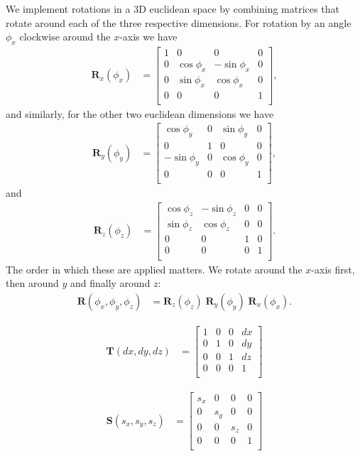 \documentclass[10pt,journal,draftclsnofoot,onecolumn]{IEEEtran}
\newcommand\bmat[1]{\begin{bmatrix}#1\end{bmatrix}}
\newcommand\mat[1]{\boldsymbol{#1}}
\newcommand\1{\vec 1}
\newcommand*\R{\mat R}
\begin{document}
We implement rotations in a 3D euclidean space by combining matrices that rotate around each of the three respective dimensions. For rotation by an angle $\phi_x$ clockwise around the $x$-axis we have
\begin{align}
\R_x(\phi_x) &= \bmat{
1  &  0           &  0           &  0 \\
0  &  \cos\phi_x  &  -\sin\phi_x &  0 \\
0  &  \sin\phi_x  &  \cos\phi_x  &  0 \\
0  &  0           &  0           &  1 \\
},
\end{align}
and similarly, for the other two euclidean dimensions we have
\begin{align}
\R_y(\phi_y) &= \bmat{
\cos\phi_y  &  0  &  \sin\phi_y  &  0 \\
0           &  1  &  0           &  0 \\
-\sin\phi_y &  0  &  \cos\phi_y  &  0 \\
0           &  0  &  0           &  1 \\
},
\end{align}
and
\begin{align}
\R_z(\phi_z) &= \bmat{
\cos\phi_z  &  -\sin\phi_z &  0  &  0 \\
\sin\phi_z  &  \cos\phi_z  &  0  &  0 \\
0           &  0           &  1  &  0 \\
0           &  0           &  0  &  1 \\
}.
\end{align}
The order in which these are applied matters. We rotate around the $x$-axis first, then around $y$ and finally around $z$:
\begin{align}
\R(\phi_x, \phi_y, \phi_z) &= \R_z(\phi_z)\;\R_y(\phi_y)\;\R_x(\phi_x).
\end{align}

\begin{align}
\boldsymbol{T}(dx,dy,dz) &= \bmat{
1  &  0  &  0  &  dx \\
0  &  1  &  0  &  dy \\
0  &  0  &  1  &  dz \\
0  &  0  &  0  &  1 \\
}
\end{align}

\begin{align}
\boldsymbol{S}(s_x,s_y,s_z) &= \bmat{
s_x  &  0    &  0    &  0 \\
0    &  s_y  &  0    &  0 \\
0    &  0    &  s_z  &  0 \\
0    &  0    &  0    &  1 \\
}
\end{align}
\end{document}
